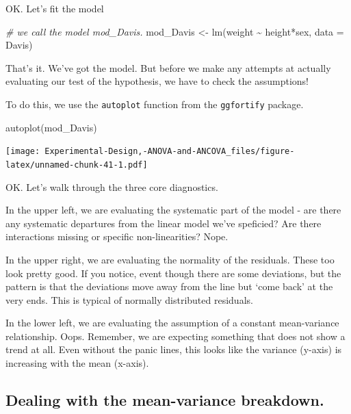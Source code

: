 \documentclass[
]{book}
\newenvironment{Shaded}{\begin{snugshade}}{\end{snugshade}}
\newcommand{\AttributeTok}[1]{\textcolor[rgb]{0.77,0.63,0.00}{#1}}
\newcommand{\CommentTok}[1]{\textcolor[rgb]{0.56,0.35,0.01}{\textit{#1}}}
\newcommand{\FunctionTok}[1]{\textcolor[rgb]{0.00,0.00,0.00}{#1}}
\newcommand{\NormalTok}[1]{#1}
\newcommand{\OtherTok}[1]{\textcolor[rgb]{0.56,0.35,0.01}{#1}}
\newcommand{\SpecialCharTok}[1]{\textcolor[rgb]{0.00,0.00,0.00}{#1}}
\begin{document}
OK. Let's fit the model

\begin{Shaded}
\begin{Highlighting}[]
\CommentTok{\# we call the model mod\_Davis.}
\NormalTok{mod\_Davis }\OtherTok{\textless{}{-}} \FunctionTok{lm}\NormalTok{(weight }\SpecialCharTok{\textasciitilde{}}\NormalTok{ height}\SpecialCharTok{*}\NormalTok{sex, }\AttributeTok{data =}\NormalTok{ Davis)}
\end{Highlighting}
\end{Shaded}

That's it. We've got the model. But before we make any attempts at actually evaluating our test of the hypothesis, we have to check the assumptions!

To do this, we use the \texttt{autoplot} function from the \texttt{ggfortify} package.

\begin{Shaded}
\begin{Highlighting}[]
\FunctionTok{autoplot}\NormalTok{(mod\_Davis)}
\end{Highlighting}
\end{Shaded}

\texttt{[image: Experimental-Design,-ANOVA-and-ANCOVA\_files/figure-latex/unnamed-chunk-41-1.pdf]}

OK. Let's walk through the three core diagnostics.

In the upper left, we are evaluating the systematic part of the model - are there any systematic departures from the linear model we've speficied? Are there interactions missing or specific non-linearities? Nope.

In the upper right, we are evaluating the normality of the residuals. These too look pretty good. If you notice, event though there are some deviations, but the pattern is that the deviations move away from the line but `come back' at the very ends. This is typical of normally distributed residuals.

In the lower left, we are evaluating the assumption of a constant mean-variance relationship. Oops. Remember, we are expecting something that does not show a trend at all. Even without the panic lines, this looks like the variance (y-axis) is increasing with the mean (x-axis).

\hypertarget{dealing-with-the-mean-variance-breakdown.}{%
\subsection{Dealing with the mean-variance breakdown.}\label{dealing-with-the-mean-variance-breakdown.}}
\end{document}
